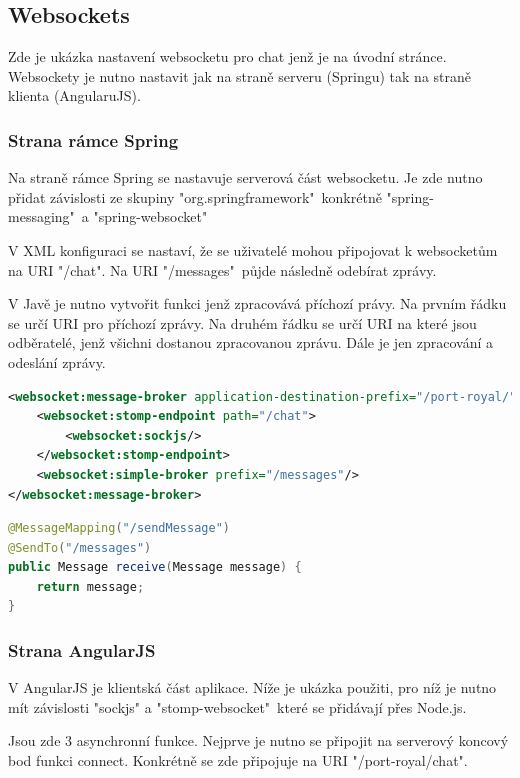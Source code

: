 \documentclass[czech,master,public,dept460,male,cpdeclaration,twoside]{diploma}
\begin{document}
\subsection{Websockets}
Zde je ukázka nastavení websocketu pro chat jenž je na úvodní stránce. Websockety je nutno nastavit jak na straně serveru (Springu) tak na straně klienta (AngularuJS). 

\subsubsection{Strana rámce Spring}
Na straně rámce Spring se nastavuje serverová část websocketu. Je zde nutno přidat závislosti ze skupiny "org.springframework"~konkrétně "spring-messaging"~a "spring-websocket"

V XML konfiguraci se nastaví, že se uživatelé mohou připojovat k websocketům na URI "/chat". Na URI "/messages"~půjde následně odebírat zprávy.

V Javě je nutno vytvořit funkci jenž zpracovává příchozí právy. Na prvním řádku se určí URI pro příchozí zprávy. Na druhém řádku se určí URI na které jsou odběratelé, jenž všichni dostanou zpracovanou zprávu. Dále je jen zpracování a odeslání zprávy.

\begin{lstlisting}[language=XML, caption=XML konfigurace websocketu]
<websocket:message-broker application-destination-prefix="/port-royal/">
    <websocket:stomp-endpoint path="/chat">
        <websocket:sockjs/>
    </websocket:stomp-endpoint>
    <websocket:simple-broker prefix="/messages"/>
</websocket:message-broker>
\end{lstlisting}

\begin{lstlisting}[language=Java, caption=Implementace websocketu v javě]
@MessageMapping("/sendMessage")
@SendTo("/messages")
public Message receive(Message message) {
    return message;
}
\end{lstlisting}

\subsubsection{Strana AngularJS}
V AngularJS je klientská část aplikace. Níže je ukázka použiti, pro níž je nutno mít závislosti "sockjs" a "stomp-websocket"~které se přidávají přes Node.js.

Jsou zde 3 asynchronní funkce. Nejprve je nutno se připojit na serverový koncový bod funkci connect. Konkrétně se zde připojuje na URI "/port-royal/chat". 
\end{document}
